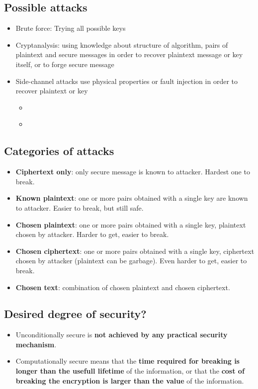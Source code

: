 \documentclass[11pt,british,faculty=ea,layout=titlefont,underline=false,titleUppercase=true,titleUnderline=true,hidelinks]{ugent2016-report}
\begin{document}
		\subsection{Possible attacks} \label{sub:security-threats-possible-attacks}
			\begin{itemize}
				\item Brute force: Trying all possible keys
				\item Cryptanalysis: using knowledge about structure of algorithm, pairs of plaintext and secure messages in order to recover plaintext message or key itself, or to forge secure message
				\item Side-channel attacks use physical properties or fault injection in order to recover plaintext or key
					\begin{itemize}
						\item {} \cite{Cade2014}
						\item {} \cite{Anthony2013}
					\end{itemize}
			\end{itemize}

		\subsection{Categories of attacks} \label{sub:categories-of-attacks}
		\begin{itemize}
			\item \textbf{Ciphertext only}: only secure message is known to attacker. Hardest one to break.
			\item \textbf{Known plaintext}: one or more pairs obtained with a single key are known to attacker. Easier to break, but still safe.
			\item \textbf{Chosen plaintext}: one or more pairs obtained with a single key, plaintext chosen by attacker. Harder to get, easier to break.
			\item \textbf{Chosen ciphertext}: one or more pairs obtained with a single key, ciphertext chosen by attacker (plaintext can be garbage). Even harder to get, easier to break.
			\item \textbf{Chosen text}: combination of chosen plaintext and chosen ciphertext.
		\end{itemize}

		\subsection{Desired degree of security?} \label{sub:desired-degree-of-security}
			\begin{itemize}
				\item Unconditionally secure is \textbf{not achieved by any practical security mechanism}.
				\item Computationally secure means that the \textbf{time required for breaking is longer than the usefull lifetime} of the information, or that the \textbf{cost of breaking the encryption is larger than the value} of the information.
			\end{itemize}
\end{document}
